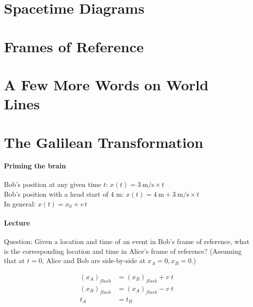 \documentclass[pagesize,headsepline,10pt,parskip=half]{scrreprt}
\begin{document}
    \clearpage
    \section{Spacetime Diagrams}

    \clearpage
    \section{Frames of Reference}

    \clearpage
    \section{A Few More Words on World Lines}

    \clearpage
    \section{The Galilean Transformation}
      \paragraph{Priming the brain}
        Bob’s position at any given time $t$: $x(t) = \SI{3}{\meter\per\second} \times t$ \\
        Bob’s position with a head start of 4 m: $x(t) = \SI{4}{\meter} + \SI{3}{\meter\per\second} \times t$ \\
        In general: $ x(t) = x_0 + v \, t $

      \paragraph{Lecture}
        Question: Given a location and time of an event in Bob’s frame of reference,
        what is the corresponding location and time in Alice’s frame of reference?
        (Assuming that at $t = 0$, Alice and Bob are side-by-side at $x_A = 0, x_B = 0$.)

        \begin{align*}
          {(x_A)}_{flash} &= {(x_B)}_{flash} + v \; t \\
          {(x_B)}_{flash} &= {(x_A)}_{flash} - v \; t \\
          t_A &= t_B
        \end{align*}
\end{document}
